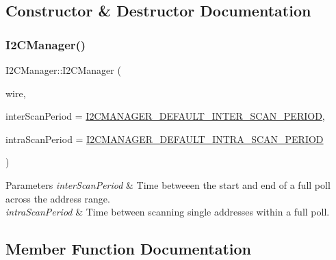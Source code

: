 \subsection{Constructor \& Destructor Documentation}
\mbox{\label{class_i2_c_manager_a2d806ad3a65969077b436f0d3a9a70f2}} 
\subsubsection{\texorpdfstring{I2\+C\+Manager()}{I2CManager()}}
{\footnotesize\ttfamily I2\+C\+Manager\+::\+I2\+C\+Manager (\begin{DoxyParamCaption}\item[{Two\+Wire $\ast$}]{wire,  }\item[{\mbox{\hyperlink{_scheduler_8h_aca1fa1a7edde6bf9e22c7617400fad31}{Duration}}}]{inter\+Scan\+Period = {\ttfamily \mbox{\hyperlink{_i2_c_manager_8h_a5aa8afc0ad4792d13a6cb089c9d50537}{I2\+C\+M\+A\+N\+A\+G\+E\+R\+\_\+\+D\+E\+F\+A\+U\+L\+T\+\_\+\+I\+N\+T\+E\+R\+\_\+\+S\+C\+A\+N\+\_\+\+P\+E\+R\+I\+OD}}},  }\item[{\mbox{\hyperlink{_scheduler_8h_aca1fa1a7edde6bf9e22c7617400fad31}{Duration}}}]{intra\+Scan\+Period = {\ttfamily \mbox{\hyperlink{_i2_c_manager_8h_a9b3d76aae3ebcca37db7e5d8cae3053e}{I2\+C\+M\+A\+N\+A\+G\+E\+R\+\_\+\+D\+E\+F\+A\+U\+L\+T\+\_\+\+I\+N\+T\+R\+A\+\_\+\+S\+C\+A\+N\+\_\+\+P\+E\+R\+I\+OD}}} }\end{DoxyParamCaption})}


\begin{DoxyParams}{Parameters}
{\em inter\+Scan\+Period} & Time betweeen the start and end of a full poll across the address range. \\
\hline
{\em intra\+Scan\+Period} & Time between scanning single addresses within a full poll. \\
\hline
\end{DoxyParams}


\subsection{Member Function Documentation}
\mbox{\label{class_i2_c_manager_a5d82cb322527d9ebea41277899fe7558}} 
